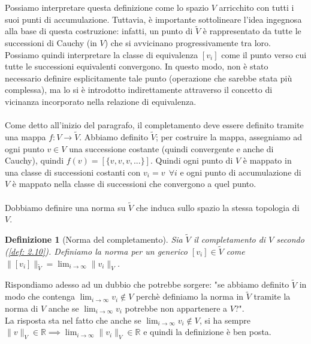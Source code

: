 \documentclass[a4paper,12pt]{report}
\newtheorem{definizione}{Definizione}[chapter]
\begin{document}
Possiamo interpretare questa definizione come lo spazio $V$ arricchito con tutti i suoi punti di accumulazione. Tuttavia, è importante sottolineare l’idea ingegnosa alla base di questa costruzione: infatti, un punto di $\tilde{V}$ è rappresentato da tutte le successioni di Cauchy (in $V$) che si avvicinano progressivamente tra loro.
Possiamo quindi interpretare la classe di equivalenza $[v_i]$ come il punto verso cui tutte le successioni equivalenti convergono. In questo modo, non è stato necessario definire esplicitamente tale punto (operazione che sarebbe stata più complessa), ma lo si è introdotto indirettamente attraverso il concetto di vicinanza incorporato nella relazione di equivalenza.
\\
\\ Come detto all'inizio del paragrafo, il completamento deve essere definito tramite una mappa $f:V \to \tilde{V}$. Abbiamo definito $\tilde{V}$; per costruire la mappa, assegniamo ad ogni punto $v \in V$ una successione costante (quindi convergente e anche di Cauchy), quindi $f(v)=[\{v,v,v,...\}]$. Quindi ogni punto di $V$ è mappato in una classe di successioni costanti con $v_i=v \ \ \forall i$ e ogni punto di accumulazione di $V$ è mappato nella classe di successioni che convergono a quel punto. 
\\
\\ Dobbiamo definire una norma su $\tilde{V}$ che induca sullo spazio la stessa topologia di $V$.

\begin{definizione}[Norma del completamento]
    Sia $\tilde{V}$ il completamento di $V$ secondo (\ref{def: 2.10}). Definiamo la norma per un generico $[v_i]\in \tilde{V}$ come $\|[v_i]\|_{\tilde{V}}= \displaystyle\lim_{i\to \infty}\|v_i\|_V$.
\end{definizione}

Rispondiamo adesso ad un dubbio che potrebbe sorgere: "se abbiamo definito $\tilde{V}$ in modo che contenga $\displaystyle\lim_{i\to\infty}v_i \notin V$ perchè definiamo la norma in $\tilde{V}$ tramite la norma di $V$ anche se $\displaystyle\lim_{i \to \infty}v_i$ potrebbe non appartenere a $V$?".
\\La risposta sta nel fatto che anche se $\displaystyle\lim_{i \to \infty}v_i \notin V$, si ha sempre $\|v\|_V\in \mathbb{R\implies}\displaystyle\lim_{i \to \infty}\|v_i\|_V \in \mathbb{R}$ e quindi la definizione è ben posta.

\vspace{0.5cm}
\end{document}
